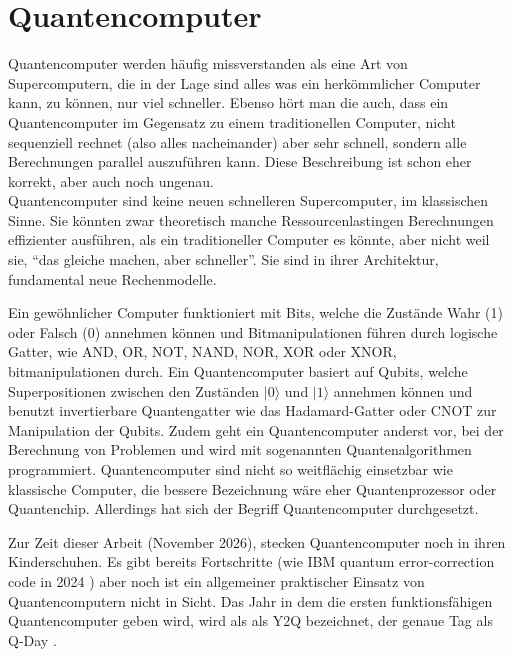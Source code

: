 \newcommand{\alphavalue}{\sqrt{\frac{1}{8}}}
\newcommand{\betavalue}{\sqrt{\frac{7}{8}}}
\newcommand{\probalpha}{{\left|\alpha\right|}^2}
\newcommand{\probbeta}{{\left|\beta\right|}^2}

\chapter{Quantencomputer}
\label{section-Quantencomputer}

Quantencomputer werden häufig missverstanden als eine Art von Supercomputern, die in der Lage sind
alles was ein herkömmlicher Computer kann, zu können, nur viel schneller.
Ebenso hört man die auch, dass ein Quantencomputer im Gegensatz zu einem traditionellen Computer,
nicht sequenziell rechnet (also alles nacheinander) aber sehr schnell, sondern alle Berechnungen parallel auszuführen kann.
Diese Beschreibung ist schon eher korrekt, aber auch noch ungenau.\\

Quantencomputer sind keine neuen schnelleren Supercomputer, im klassischen Sinne.
Sie könnten zwar theoretisch manche Ressourcenlastingen Berechnungen effizienter ausführen, als ein traditioneller Computer es könnte, aber nicht weil sie, \enquote{das gleiche machen, aber schneller}.
Sie sind in ihrer Architektur, fundamental neue Rechenmodelle.

Ein gewöhnlicher Computer funktioniert mit Bits, welche die Zustände Wahr (1) oder Falsch (0) annehmen können und Bitmanipulationen führen durch logische Gatter, wie AND, OR, NOT, NAND, NOR, XOR oder XNOR, bitmanipulationen durch.
Ein Quantencomputer basiert auf Qubits, welche Superpositionen zwischen den Zuständen $|0\rangle$ und $|1\rangle$ annehmen können und benutzt invertierbare Quantengatter wie das Hadamard-Gatter oder CNOT zur Manipulation der Qubits.
Zudem geht ein Quantencomputer anderst vor, bei der Berechnung von Problemen und wird mit sogenannten Quantenalgorithmen programmiert.
Quantencomputer sind nicht so weitflächig einsetzbar wie klassische Computer, die bessere Bezeichnung wäre eher Quantenprozessor oder Quantenchip.
Allerdings hat sich der Begriff Quantencomputer durchgesetzt.

Zur Zeit dieser Arbeit (November 2026), stecken Quantencomputer noch in ihren Kinderschuhen.
Es gibt bereits Fortschritte (wie IBM quantum error-correction code in 2024 \cite{LandmarkIBMError,smalleyWasIstQuantencomputing2025}) aber noch ist ein allgemeiner praktischer Einsatz von Quantencomputern nicht in Sicht.
Das Jahr in dem die ersten funktionsfähigen Quantencomputer geben wird, wird als als Y2Q bezeichnet, der genaue Tag als Q-Day \cite{schmehQuantencomputer2026}.

